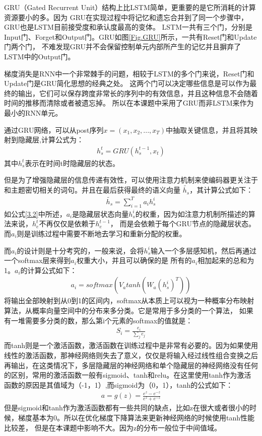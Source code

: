 \documentclass[supercite]{HustGraduPaper}
\theoremstyle{definition}
\begin{document}
GRU\cite{dey2017gate}（Gated Recurrent Unit）结构上比LSTM简单，更重要的是它所消耗的计算资源要小的多。因为
GRU在实现过程中将记忆和遗忘合并到了同一个步骤中，GRU也是LSTM目前接受度和承认度最高的变体。
LSTM一共有三个门，分别是Input门、Forget和Output门。GRU如图\ref{Fig.GRU}所示，一共有Reset门和Update门两个门，
不难发现GRU并不会保留控制单元内部所产生的记忆并且摒弃了LSTM中的Output门。

梯度消失是RNN中一个非常棘手的问题，相较于LSTM的多个门来说，Reset门和Update门是GRU简化思想的经典之处。
这两个门可以决定哪些信息是可以作为最终的输出，它们可以保存跨度非常长的序列中的有效信息，并且这种信息不会随着时间的推移而清除或者被遗忘掉。
所以在本课题中采用了GRU而非LSTM来作为最小的RNN单元。

通过GRU网络，可以从post序列$x = (x_1,x_2,...,x_T)$中抽取关键信息，并且将其映射到隐藏层,计算公式为：
\begin{align}
  h_s^t = GRU(h_s^{t-1},x_t) \label{3.1}
\end{align}
其中$h_s^t$表示在时间t时隐藏层的状态。

但是为了增强隐藏层的信息传递有效性，可以使用注意力机制来使编码器更关注于和主题密切相关的词句。并且在最后获得最终的语义向量
$\widetilde{h_s}$，其计算公式如下：
\begin{align}
  \widetilde{h_s} = \sum_{i=1}^{T}a_i h_s^i \label{3.2}
\end{align}
如公式\ref{3.2}中所述，$a_i$是隐藏层状态向量$h_s^i$的权重，因为如注意力机制所描述的算法来说，$h_e^t$不再仅仅是依赖于$h_e^{t-1}$，
而是会依赖于每个GRU节点的隐藏层状态。而$a_i$则是训练过程中需要不断地去学习和重新分配的权重。

而$a_i$的设计则是十分考究的，一般来说，会将$h_s^i$输入一个多层感知机，然后再通过一个softmax层来得到$a_i$权重大小，并且可以确保的是
所有的$a_i$相加起来的总和为1。$a_i$的计算公式如下：
\begin{align}
  a_i = softmax(V_a tanh(W_a(h_s^i)^T)) \label{3.3}
\end{align}
将输出全部映射到从0到1的区间内，softmax从本质上可以视为一种概率分布映射算法，从概率向量空间中的分布来多分类。它是常用于多分类的一个算法，
如果有一堆需要多分类的数，那么第i个元素的softmax的值就是：
\begin{align}
  S_i = \frac{e_i}{\sum_j e_j}
\end{align}
而tanh则是一个激活函数，激活函数在训练过程中是非常有必要的。因为如果使用线性的激活函数，那神经网络则失去了意义，仅仅是将输入经过线性组合变换之后
再输出，在这类情况下，多层隐藏层的神经网络和单个隐藏层的神经网络没有任何的区别，常用的激活函数一般有sigmoid、tanh和relu。在这里使用tanh作为激活
函数的原因是其值域为（-1，1）,而sigmoid为（0，1），tanh的公式如下：
\begin{align}
  a = g(z) = \frac{e^z - e^{-z}}{e^z + e^{-z}}
\end{align}
但是sigmoid和tanh作为激活函数都有一些共同的缺点，比如z在很大或者很小的时候，梯度基本为0。所以在优化梯度下降算法来更新神经网络的时候使用tanh性能比较差，
但是在本课题中影响不大。因为z的分布一般位于中间值域。
\end{document}
